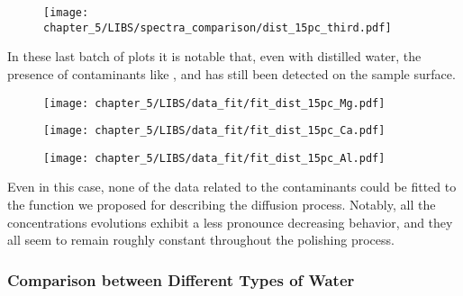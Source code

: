 \vspace*{-68pt}
\begin{figure}[H]
    \centering
    \texttt{[image: chapter\_5/LIBS/spectra\_comparison/dist\_15pc\_third.pdf]} 
 \end{figure}

In these last batch of plots it is notable that, even with distilled water, the presence of contaminants like ,  and  has still been detected on the sample surface. 

 \begin{figure}[H]
    \centering
    \texttt{[image: chapter\_5/LIBS/data\_fit/fit\_dist\_15pc\_Mg.pdf]} 
 \end{figure}

 \begin{figure}[H]
    \centering
    \texttt{[image: chapter\_5/LIBS/data\_fit/fit\_dist\_15pc\_Ca.pdf]} 
 \end{figure}
    \vspace{-40pt}
 \begin{figure}[H]
    \centering
    \texttt{[image: chapter\_5/LIBS/data\_fit/fit\_dist\_15pc\_Al.pdf]} 
 \end{figure}

Even in this case, none of the data related to the contaminants could be fitted to the function we proposed for describing the diffusion process. Notably, all the concentrations evolutions exhibit a less pronounce decreasing behavior, and they all seem to remain roughly constant throughout the polishing process.

\subsubsection{Comparison between Different Types of Water}
\label{subsubsec:comparison_between_waters}

